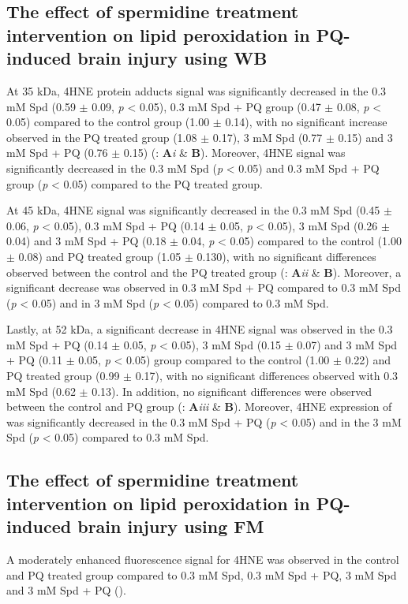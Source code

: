 \subsection{The effect of spermidine treatment intervention on lipid peroxidation in PQ-induced brain injury using WB}
At 35 kDa, 4HNE protein adducts signal was significantly decreased in the 0.3 mM Spd (0.59 $\pm$ 0.09, \textit{p} < 0.05), 0.3 mM Spd + PQ group (0.47 $\pm$ 0.08, \textit{p} < 0.05) compared to the control group (1.00 $\pm$ 0.14), with no significant increase observed in the PQ treated group (1.08 $\pm$ 0.17), 3 mM Spd (0.77 $\pm$ 0.15) and 3 mM Spd + PQ (0.76 $\pm$ 0.15) (: \textbf{A}\textit{i} \& \textbf{B}). Moreover, 4HNE signal was significantly decreased in the 0.3 mM Spd (\textit{p} < 0.05) and 0.3 mM Spd + PQ group (\textit{p} < 0.05) compared to the PQ treated group. 

At 45 kDa, 4HNE signal was significantly decreased in the 0.3 mM Spd (0.45 $\pm$ 0.06, \textit{p} < 0.05), 0.3 mM Spd + PQ (0.14 $\pm$ 0.05, \textit{p} < 0.05), 3 mM Spd (0.26 $\pm$ 0.04) and 3 mM Spd + PQ (0.18 $\pm$ 0.04, \textit{p} < 0.05) compared to the control (1.00 $\pm$ 0.08) and PQ treated group (1.05 $\pm$ 0.130), with no significant differences observed between the control and the PQ treated group (: \textbf{A}\textit{ii} \& \textbf{B}). Moreover, a significant decrease was observed in 0.3 mM Spd + PQ compared to 0.3 mM Spd (\textit{p} < 0.05) and in 3 mM Spd (\textit{p} < 0.05) compared to 0.3 mM Spd.

Lastly, at 52 kDa, a significant decrease in 4HNE signal was observed in the 0.3 mM Spd + PQ (0.14 $\pm$ 0.05, \textit{p} < 0.05), 3 mM Spd (0.15 $\pm$ 0.07) and 3 mM Spd + PQ (0.11 $\pm$ 0.05, \textit{p} < 0.05) group compared to the control (1.00 $\pm$ 0.22) and PQ treated group (0.99 $\pm$ 0.17), with no significant differences observed with 0.3 mM Spd (0.62 $\pm$ 0.13). In addition, no significant differences were observed between the control and PQ group (: \textbf{A}\textit{iii} \& \textbf{B}). Moreover, 4HNE expression of was significantly decreased in the 0.3 mM Spd + PQ (\textit{p} < 0.05) and in the 3 mM Spd (\textit{p} < 0.05) compared to 0.3 mM Spd.

\subsection{The effect of spermidine treatment intervention on lipid peroxidation in PQ-induced brain injury using FM}
A moderately enhanced fluorescence signal for 4HNE was observed in the control and PQ treated group compared to 0.3 mM Spd, 0.3 mM Spd + PQ, 3 mM Spd and 3 mM Spd + PQ ().

